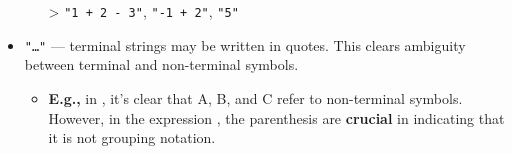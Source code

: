 \begin{Def}
\begin{itemize}
\begin{itemize}
        \item [>] \texttt{"1 + 2 - 3"}, \texttt{"-1 + 2"}, \texttt{"5"}
        \end{itemize}
    \item \texttt{"\ldots"} — terminal strings may be written in quotes. This clears ambiguity between terminal and non-terminal symbols.
    \begin{itemize}
        \item \textbf{E.g.,} in , it's clear that A, B, and C refer to non-terminal symbols. However, in the expression , the parenthesis are \textbf{crucial} in indicating that it is not grouping notation.
    \end{itemize}
\end{itemize}
\end{Def}

\newpage

